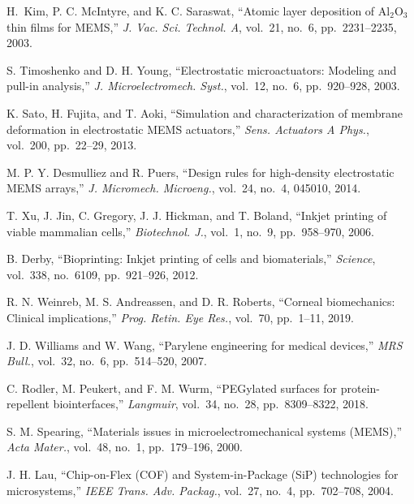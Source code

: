 \documentclass[conference]{IEEEtran}
\begin{document}

\begin{thebibliography}{99}
H.~Kim, P. C. McIntyre, and K. C. Saraswat,
“Atomic layer deposition of Al$_2$O$_3$ thin films for MEMS,”
\emph{J. Vac. Sci. Technol. A}, vol.~21, no.~6, pp.~2231–2235, 2003.

S. Timoshenko and D. H. Young,
“Electrostatic microactuators: Modeling and pull-in analysis,”
\emph{J. Microelectromech. Syst.}, vol.~12, no.~6, pp.~920–928, 2003.

K. Sato, H. Fujita, and T. Aoki,
“Simulation and characterization of membrane deformation in electrostatic MEMS actuators,”
\emph{Sens. Actuators A Phys.}, vol.~200, pp.~22–29, 2013.

M. P. Y. Desmulliez and R. Puers,
“Design rules for high-density electrostatic MEMS arrays,”
\emph{J. Micromech. Microeng.}, vol.~24, no.~4, 045010, 2014.

T. Xu, J. Jin, C. Gregory, J. J. Hickman, and T. Boland,
“Inkjet printing of viable mammalian cells,”
\emph{Biotechnol. J.}, vol.~1, no.~9, pp.~958–970, 2006.

B. Derby,
“Bioprinting: Inkjet printing of cells and biomaterials,”
\emph{Science}, vol.~338, no.~6109, pp.~921–926, 2012.

R. N. Weinreb, M. S. Andreassen, and D. R. Roberts,
“Corneal biomechanics: Clinical implications,”
\emph{Prog. Retin. Eye Res.}, vol.~70, pp.~1–11, 2019.

J. D. Williams and W. Wang,
“Parylene engineering for medical devices,”
\emph{MRS Bull.}, vol.~32, no.~6, pp.~514–520, 2007.

C. Rodler, M. Peukert, and F. M. Wurm,
“PEGylated surfaces for protein-repellent biointerfaces,”
\emph{Langmuir}, vol.~34, no.~28, pp.~8309–8322, 2018.

S. M. Spearing,
“Materials issues in microelectromechanical systems (MEMS),”
\emph{Acta Mater.}, vol.~48, no.~1, pp.~179–196, 2000.

J. H. Lau,
“Chip-on-Flex (COF) and System-in-Package (SiP) technologies for microsystems,”
\emph{IEEE Trans. Adv. Packag.}, vol.~27, no.~4, pp.~702–708, 2004.
\end{thebibliography}

\balance
\end{document}
